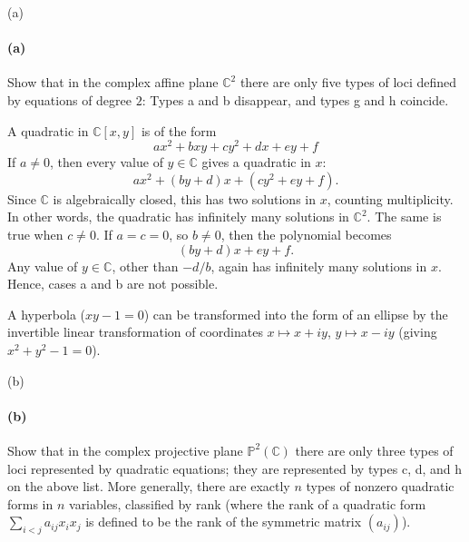 \documentclass[12pt]{article}
\newlength{\myparskip}
\newenvironment{fullbox}{\begin{lrbox}{\savefullbox}\begin{minipage}{\dimexpr\textwidth-2\fboxsep\relax}\setlength{\parskip}{\myparskip}}{\end{minipage}\end{lrbox}\framebox[\textwidth]{\usebox{\savefullbox}}}
\newenvironment{pbox}[1][]{\begin{fullbox}\ifx#1\empty\else\paragraph{#1}\fi}{\end{fullbox}}
\newcommand{\C}{\mathbb{C}}
\newcommand{\<}{\langle}
\renewcommand{\>}{\rangle}
\renewcommand{\P}{\mathbb{P}}
\begin{document}
\begin{pbox}[(a)]
    Show that in the complex affine plane $\C^2$ there are only five  types of loci defined by equations of degree $2$: Types a and b  disappear, and types g and h  coincide.
\end{pbox}

A quadratic in $\C[x, y]$ is of the form
\[
    ax^2 + bxy + cy^2 + dx + ey + f
\]
If $a \ne 0$, then every value of $y \in \C$  gives a quadratic in $x$:
\[
    ax^2 + (by + d)x + (cy^2 + ey + f).
\]
Since $\C$ is algebraically closed, this has two solutions in $x$, counting multiplicity. In other words, the quadratic has infinitely many solutions in $\C^2$. The same is true when $c \ne 0$. If $a = c = 0$, so $b \ne 0$, then the polynomial becomes
\[
    (by + d)x + ey + f.
\]
Any value of $y \in \C$, other than $-d/b$, again has infinitely many solutions in $x$. Hence, cases a and b are not possible.

A hyperbola ($xy - 1 = 0$) can be transformed into the form of an ellipse by the invertible linear transformation of coordinates $x \mapsto x + iy$, $y \mapsto x - iy$ (giving $x^2 + y^2 - 1 = 0$).

\newpage
\begin{pbox}[(b)]
    Show that in the complex projective plane $\P^2(\C)$ there are only three types of loci represented by quadratic equations; they are represented by types c, d, and h  on the above list. More generally, there are exactly $n$ types of nonzero quadratic forms in $n$ variables, classified by rank (where the rank of a quadratic form $\sum_{i < j} a_{ij}x_ix_j$ is defined to be the rank of the symmetric matrix $(a_{ij})$). 
\end{pbox}
\end{document}
